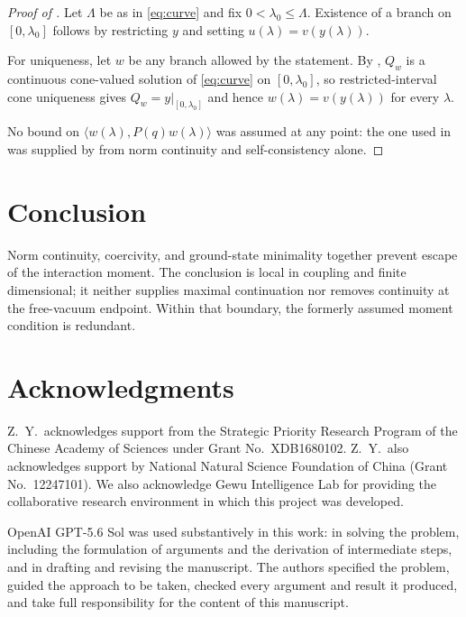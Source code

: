 \documentclass[11pt,reqno]{amsart}
\theoremstyle{plain}
\theoremstyle{definition}
\theoremstyle{remark}
\numberwithin{equation}{section}
\begin{document}
\begin{proof}[Proof of ]
  Let $\Lambda$ be as in \eqref{eq:curve} and fix $0<\lambda_0\le\Lambda$.
  Existence of a branch on $[0,\lambda_0]$ follows by restricting
  $y$ and setting $u(\lambda)=v(y(\lambda))$.

  For uniqueness, let $w$ be any branch allowed by the statement. By
  , $Q_w$ is a continuous cone-valued solution of
  \eqref{eq:curve} on $[0,\lambda_0]$, so restricted-interval cone
  uniqueness gives $Q_w=y|_{[0,\lambda_0]}$ and hence
  $w(\lambda)=v(y(\lambda))$ for every $\lambda$.

  No bound on $\langle w(\lambda),P(q)w(\lambda)\rangle$ was assumed at any
  point: the one used in  was supplied by
   from norm continuity and self-consistency alone.
\end{proof}

\section{Conclusion}

Norm continuity, coercivity, and ground-state minimality together prevent
escape of the interaction moment.  The conclusion is local in coupling and
finite dimensional; it neither supplies maximal continuation nor removes
continuity at the free-vacuum endpoint.  Within that boundary, the formerly
assumed moment condition is redundant.

\section*{Acknowledgments}

Z.\ Y.\ acknowledges support from the Strategic Priority Research Program of the
Chinese Academy of Sciences under Grant No.~XDB1680102. Z.\ Y.\ also
acknowledges support by National Natural Science Foundation of China (Grant
No.~12247101). We also acknowledge Gewu Intelligence Lab for providing the
collaborative research environment in which this project was developed.

OpenAI GPT-5.6 Sol was used substantively in this work: in solving the
problem, including the formulation of arguments and the derivation of
intermediate steps, and in drafting and revising the manuscript. The
authors specified the problem, guided the approach to be taken, checked
every argument and result it produced, and take full responsibility for
the content of this manuscript.



\end{document}
